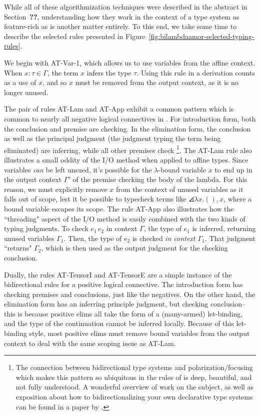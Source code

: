 While all of these algorithmization techniques were described in the abstract in Section~\textbf{??}, understanding how they work in the context of a type system as feature-rich as \bilambdaamor is another matter entirely. To this end, we take some time to describe the selected rules presented in Figure~\ref{fig:bilambdaamor-selected-typing-rules}.

We begin with AT-Var-1, which allows us to use variables from the affine context. When $x : \tau \in \Gamma$, the term $x$ infers the type $\tau$. Using this rule in a derivation counts as a use of $x$, and so $x$ must be removed from the output context, as it is no longer unused.

The pair of rules AT-Lam and AT-App exhibit a common pattern which is common to nearly all negative logical connectives in \bilambdaamor. For introduction form, both the conclusion and premise are checking. In the elimination form, the conclusion as well as the principal judgment (the judgment typing the term being eliminated) are inferring, while all other premises check
\footnote{
The connection between bidirectional type systems and polarization/focusing which makes this pattern so ubiquitous in the rules of \bilambdaamor is deep, beautiful, and not fully understood. A wonderful overview of work on the subject, as well as exposition about how to bidirectionalizing your own declarative type systems can be found in a paper by \citet{dunfield19:bidir-survey}.
}.
The AT-Lam rule also illustrates a small oddity of the I/O method when applied to affine types. Since variables \textit{can} be left unsued, it's possible for the $\lambda$-bound variable $x$ to end up in the output context $\Gamma'$ of the premise checking the body of the lambda. For this reason, we must explicitly remove $x$ from the context of unused variables as it falls out of scope, lest it be possible to typecheck terms like $\angles{\lambda x. (), x}$, where a bound variable escapes its scope. The rule AT-App also illustrates how the ``threading" aspect of the I/O method is easily combined with the two kinds of typing judgments. To check $e_1 \, e_2$ in context $\Gamma$, the type of $e_1$ is inferred, returning unused variables $\Gamma_1$. Then, the type of $e_2$ is checked \textit{in context $\Gamma_1$}. That judgment ``returns" $\Gamma_2$, which is then used as the output judgment for the checking conclusion.

Dually, the rules AT-TensorI and AT-TensorE are a simple instance of the bidirectional rules for a positive logical connective. The introduction form has checking premises and conclusions, just like the negatives. On the other hand, the elimination form has an inferring principle judgment, but checking conclusion-- this is because positive elims all take the form of a (many-armed) let-binding, and the type of the continuation cannot be inferred locally. Because of this let-binding style, most positive elims must remove bound variables from the output context to deal with the same scoping issue as AT-Lam.

